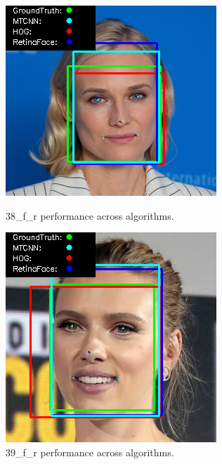 \documentclass{l4proj}
\begin{document}
\begin{appendices}
\begin{figure}[h!]
  \centering
  \begin{minipage}{0.49\textwidth}
    \centering
     \includegraphics[width=\textwidth]{images/appendix/38.png}
    \caption{38\_f\_r performance across algorithms.}
    \label{whoopi_result}
  \end{minipage}
    \hfill
    \begin{minipage}{0.49\textwidth}
    \centering
     \includegraphics[width=\textwidth]{images/appendix/39.png}
    \caption{39\_f\_r performance across algorithms.}
    \label{whoopi_result}
  \end{minipage}
\end{figure}


\end{appendices}
\end{document}
